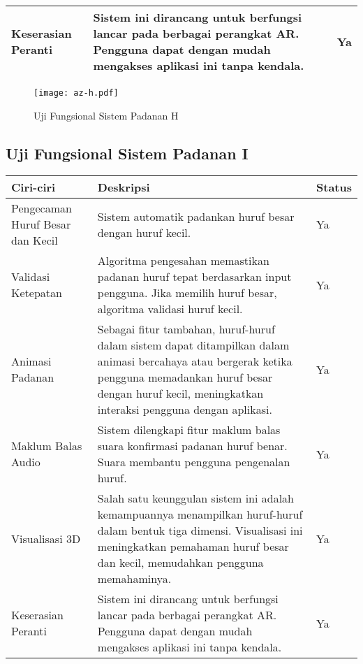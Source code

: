 \begin{itemize}
\begin{itemize}
\begin{itemize}
\begin{itemize}
\begin{itemize}
\begin{itemize}
\begin{itemize}
\begin{itemize}
\begin{flushleft}
\begin{tabular}{>{\raggedright}p{3cm}p{9cm}>{\centering\arraybackslash}p{2cm}}
Keserasian Peranti & Sistem ini dirancang untuk berfungsi lancar pada berbagai perangkat AR. Pengguna dapat dengan mudah mengakses aplikasi ini tanpa kendala. & Ya \\
\bottomrule
\end{tabular}

\begin{figure}
    \centering
    \texttt{[image: az-h.pdf]}
    \caption{Uji Fungsional  Sistem Padanan H }
    \label{fig:az-h.pdf}
\end{figure}
\clearpage




\subsection{Uji Fungsional  Sistem Padanan I}

\begin{tabular}{>{\raggedright}p{3cm}p{9cm}>{\centering\arraybackslash}p{2cm}}
\toprule
\textbf{Ciri-ciri} & \textbf{Deskripsi} & \textbf{Status} \\
\midrule
Pengecaman Huruf Besar dan Kecil & Sistem automatik padankan huruf besar dengan huruf kecil. & Ya \\

Validasi Ketepatan & Algoritma pengesahan memastikan padanan huruf tepat berdasarkan input pengguna. Jika memilih huruf besar, algoritma validasi huruf kecil. & Ya \\

Animasi Padanan & Sebagai fitur tambahan, huruf-huruf dalam sistem dapat ditampilkan dalam animasi bercahaya atau bergerak ketika pengguna memadankan huruf besar dengan huruf kecil, meningkatkan interaksi pengguna dengan aplikasi. & Ya \\

Maklum Balas Audio & Sistem dilengkapi fitur maklum balas suara konfirmasi padanan huruf benar. Suara membantu pengguna pengenalan huruf. & Ya \\

Visualisasi 3D & Salah satu keunggulan sistem ini adalah kemampuannya menampilkan huruf-huruf dalam bentuk tiga dimensi. Visualisasi ini meningkatkan pemahaman huruf besar dan kecil, memudahkan pengguna memahaminya. & Ya \\

Keserasian Peranti & Sistem ini dirancang untuk berfungsi lancar pada berbagai perangkat AR. Pengguna dapat dengan mudah mengakses aplikasi ini tanpa kendala. & Ya \\
\bottomrule
\end{tabular}


\end{flushleft}
\end{itemize}
\end{itemize}
\end{itemize}
\end{itemize}
\end{itemize}
\end{itemize}
\end{itemize}
\end{itemize}
